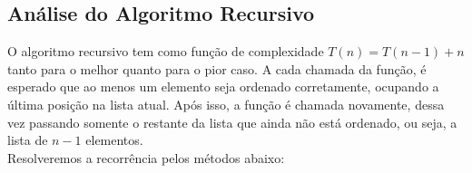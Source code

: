 \subsection{Análise do Algoritmo Recursivo}
O algoritmo recursivo tem como função de complexidade $T(n) = T(n - 1) + n$ tanto para o melhor quanto para o pior caso.
A cada chamada da função, é esperado que ao menos um elemento seja ordenado corretamente, ocupando a última posição na lista atual.
Após isso, a função é chamada novamente, dessa vez passando somente o restante da lista que ainda não está ordenado, ou seja, a lista de $n - 1$ elementos. \\
Resolveremos a recorrência pelos métodos abaixo:




